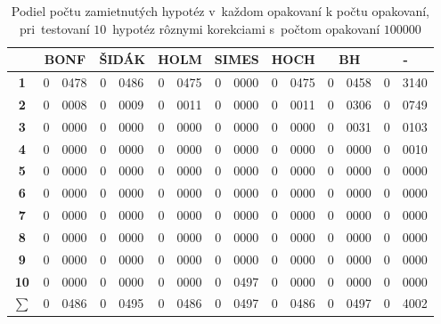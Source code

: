\begin{table}[h!]
  \centering
  \begin{tabular}{c|r@{.}lr@{.}lr@{.}lr@{.}lr@{.}lr@{.}lr@{.}l}
    & \multicolumn{2}{c}{\bf BONF} & \multicolumn{2}{c}{\bf ŠIDÁK} & \multicolumn{2}{c}{\bf HOLM} & \multicolumn{2}{c}{\bf SIMES} 
    & \multicolumn{2}{c}{\bf HOCH} & \multicolumn{2}{c}{\bf BH} & \multicolumn{2}{c}{\bf -} \\ \hline
    {\bf 1} & 0&0478 & 0&0486 & 0&0475 & 0&0000 & 0&0475 & 0&0458 & 0&3140 \\ 
    {\bf 2} & 0&0008 & 0&0009 & 0&0011 & 0&0000 & 0&0011 & 0&0306 & 0&0749 \\ 
    {\bf 3} & 0&0000 & 0&0000 & 0&0000 & 0&0000 & 0&0000 & 0&0031 & 0&0103 \\ 
    {\bf 4} & 0&0000 & 0&0000 & 0&0000 & 0&0000 & 0&0000 & 0&0000 & 0&0010 \\ 
    {\bf 5} & 0&0000 & 0&0000 & 0&0000 & 0&0000 & 0&0000 & 0&0000 & 0&0000 \\ 
    {\bf 6} & 0&0000 & 0&0000 & 0&0000 & 0&0000 & 0&0000 & 0&0000 & 0&0000 \\ 
    {\bf 7} & 0&0000 & 0&0000 & 0&0000 & 0&0000 & 0&0000 & 0&0000 & 0&0000 \\ 
    {\bf 8} & 0&0000 & 0&0000 & 0&0000 & 0&0000 & 0&0000 & 0&0000 & 0&0000 \\ 
    {\bf 9} & 0&0000 & 0&0000 & 0&0000 & 0&0000 & 0&0000 & 0&0000 & 0&0000 \\ 
    {\bf 10} & 0&0000 & 0&0000 & 0&0000 & 0&0497 & 0&0000 & 0&0000 & 0&0000 \\ \hline
    {\bf $\sum$} & 0&0486 & 0&0495 & 0&0486 & 0&0497 & 0&0486 & 0&0497 & 0&4002 \\ 
  \end{tabular}
  \caption{Podiel počtu zamietnutých hypotéz v~každom opakovaní k počtu opakovaní, 
  pri~testovaní $10$~hypotéz rôznymi korekciami s~počtom opakovaní $100000$}
  \captionsetup{justification=centering}
  \label{tab04:3}
\end{table}

